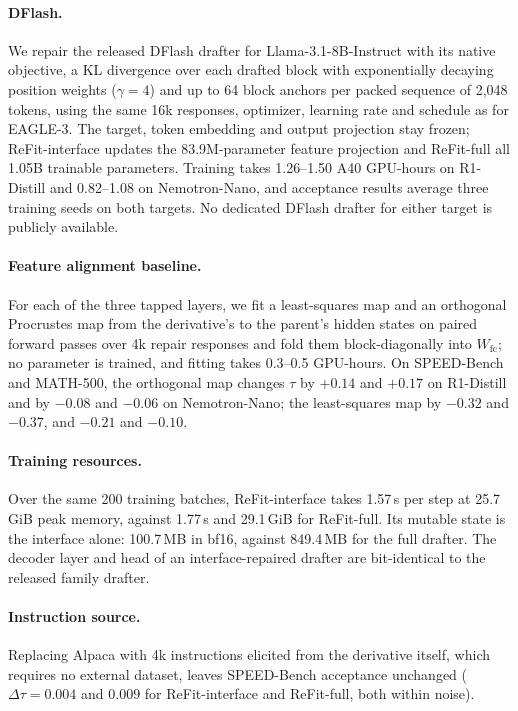 \documentclass[11pt]{article}
\newcommand{\refitI}{ReFit-interface}
\newcommand{\refitF}{ReFit-full}
\begin{document}
\paragraph{DFlash.}
We repair the released DFlash drafter for Llama-3.1-8B-Instruct with its native objective, a KL divergence over each drafted block with exponentially decaying position weights ($\gamma{=}4$) and up to 64 block anchors per packed sequence of 2,048 tokens, using the same 16k responses, optimizer, learning rate and schedule as for EAGLE-3.
The target, token embedding and output projection stay frozen; \refitI{} updates the 83.9M-parameter feature projection and \refitF{} all 1.05B trainable parameters.
Training takes 1.26--1.50 A40 GPU-hours on R1-Distill and 0.82--1.08 on Nemotron-Nano, and acceptance results average three training seeds on both targets.
No dedicated DFlash drafter for either target is publicly available.

\paragraph{Feature alignment baseline.}
For each of the three tapped layers, we fit a least-squares map and an orthogonal Procrustes map from the derivative's to the parent's hidden states on paired forward passes over 4k repair responses and fold them block-diagonally into $W_{\text{fc}}$; no parameter is trained, and fitting takes 0.3--0.5 GPU-hours.
On SPEED-Bench and MATH-500, the orthogonal map changes $\tau$ by $+0.14$ and $+0.17$ on R1-Distill and by $-0.08$ and $-0.06$ on Nemotron-Nano; the least-squares map by $-0.32$ and $-0.37$, and $-0.21$ and $-0.10$.

\paragraph{Training resources.}
Over the same 200 training batches, \refitI{} takes 1.57\,s per step at 25.7\,GiB peak memory, against 1.77\,s and 29.1\,GiB for \refitF{}.
Its mutable state is the interface alone: 100.7\,MB in bf16, against 849.4\,MB for the full drafter.
The decoder layer and head of an interface-repaired drafter are bit-identical to the released family drafter.

\paragraph{Instruction source.}
Replacing Alpaca with 4k instructions elicited from the derivative itself, which requires no external dataset, leaves SPEED-Bench acceptance unchanged ($\Delta\tau = 0.004$ and $0.009$ for \refitI{} and \refitF{}, both within noise).
\end{document}
